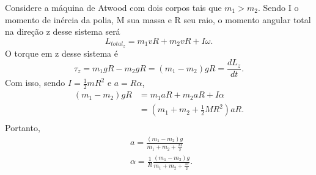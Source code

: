 \documentclass[PhysicsII/physicsII_notes.tex]{subfiles}
\begin{document}
\begin{example}
	Considere a máquina de Atwood com dois corpos tais que \(m_{1} > m_{2}\). Sendo I o momento de inércia da polia, M sua massa e R seu raio, o momento angular total na direção z desse sistema será
	\[
		L_{total_z} = m_{1}vR + m_{2}vR + I\omega.
	\]
	O torque em z desse sistema é
	\[
		\tau_{z} = m_{1}gR - m_{2}gR = (m_{1}-m_{2})gR = \frac{dL_{z}}{dt}.
	\]
	Com isso, sendo \(I = \frac{1}{2}mR^{2}\) e \(a  = R\alpha \),
	\begin{align*}
		(m_{1}-m_{2})gR & = m_{1}aR + m_{2}aR + I\alpha        \\
		                & = (m_{1}+m_{2}+\frac{1}{2}MR^{2})aR. \\
	\end{align*}
	Portanto,
	\begin{align*}
		 & a = \frac{(m_{1}-m_{2})g}{m_{1}+m_{2}+\frac{M}{2}}                   \\
		 & \alpha = \frac{1}{R}\frac{(m_{1}-m_{2})g}{m_{1}+m_{2}+\frac{M}{2}}.\
	\end{align*}
\end{example}
\end{document}

